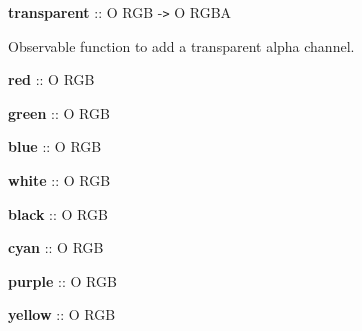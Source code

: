  

{{\bf transparent} :: O RGB -{\tt >} O RGBA}

\hspace{0.05\textwidth}\begin{minipage}{0.9\textwidth}Observable function to add a transparent alpha channel.\end{minipage}

 

{{\bf red} :: O RGB}

 

{{\bf green} :: O RGB}

 

{{\bf blue} :: O RGB}

 

{{\bf white} :: O RGB}

 

{{\bf black} :: O RGB}

 

{{\bf cyan} :: O RGB}

 

{{\bf purple} :: O RGB}

 

{{\bf yellow} :: O RGB}

 

 

